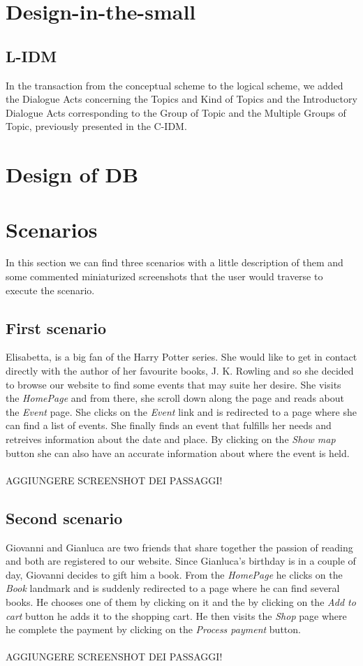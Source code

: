 \documentclass[12pt,a4paper]{article}
\begin{document}
\section{Design-in-the-small}
\subsection{L-IDM}
In the transaction from the conceptual scheme to the logical scheme, we added the Dialogue Acts concerning the Topics and Kind of Topics and the Introductory Dialogue Acts corresponding to the Group of Topic and the Multiple Groups of Topic, previously presented in the C-IDM.
\section{Design of DB}
\section{Scenarios}
In this section we can find three scenarios with a little description of them and some commented miniaturized screenshots that the user would traverse to execute the scenario.
\subsection{First scenario}
Elisabetta, is a big fan of the Harry Potter series. She would like to get in contact directly with the author of her favourite books, J. K. Rowling and so she decided to browse our website to find some events that may suite her desire. She visits the \textit{HomePage} and from there, she scroll down along the page and reads about the \textit{Event} page. She clicks on the \textit{Event} link and is redirected to a page where she can find a list of events. She finally finds an event that fulfills her needs and retreives information about the date and place. By clicking on the \textit{Show map} button she can also have an accurate information about where the event is held.\\\\
AGGIUNGERE SCREENSHOT DEI PASSAGGI!
\subsection{Second scenario}
Giovanni and Gianluca are two friends that share together the passion of reading and both are registered to our website. Since Gianluca's birthday is in a couple of day, Giovanni decides to gift him a book. From the \textit{HomePage} he clicks on the \textit{Book} landmark and is suddenly redirected to a page where he can find several books. He chooses one of them by clicking on it and the by clicking on the \textit{Add to cart} button he adds it to the shopping cart. He then visits the \textit{Shop} page where he complete the payment by clicking on the \textit{Process payment} button.\\\\
AGGIUNGERE SCREENSHOT DEI PASSAGGI!
\end{document}
